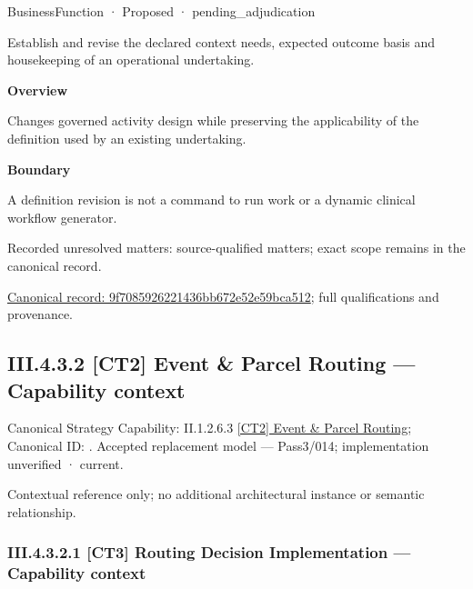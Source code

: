 \label{element:9f7085926221436bb672e52e59bca512}
{\small BusinessFunction · Proposed · pending\_adjudication}\par

Establish and revise the declared context needs, expected outcome basis and housekeeping of an operational undertaking.



\textbf{Overview}



Changes governed activity design while preserving the applicability of the definition used by an existing undertaking.



\textbf{Boundary}



A definition revision is not a command to run work or a dynamic clinical workflow generator.


{\small Recorded unresolved matters: source-qualified matters; exact scope remains in the canonical record.}\par
{\footnotesize \href{../../../../../../../../continuum/business/business-function/9f7085926221436bb672e52e59bca512.md}{Canonical record: 9f7085926221436bb672e52e59bca512}; full qualifications and provenance.}\par
\subsection*{III.4.3.2 [CT2] Event \& Parcel Routing — Capability context}
\label{navigation:III.4.3.2}

{\small Canonical Strategy Capability: II.1.2.6.3 \hyperref[element:3651fa9017f84b81a8a12b7a9a6c01a4]{[CT2] Event \& Parcel Routing}; Canonical ID: \texttt{}. Accepted replacement model — Pass3/014; implementation unverified · current.}\par
Contextual reference only; no additional architectural instance or semantic relationship.\par
\subsubsection*{III.4.3.2.1 [CT3] Routing Decision Implementation — Capability context}
\label{navigation:III.4.3.2.1}

